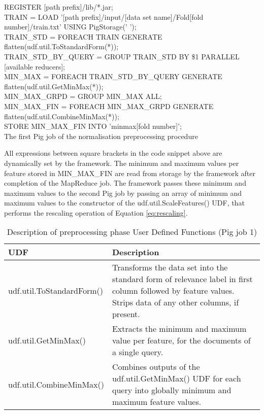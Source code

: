 \begin{algorithm}
REGISTER [path prefix]/lib/*.jar;\\
TRAIN = LOAD '[path prefix]/input/[data set name]/Fold[fold number]/train.txt' USING PigStorage(' ');\\
TRAIN\_STD = FOREACH TRAIN GENERATE flatten(udf.util.ToStandardForm(*));\\
TRAIN\_STD\_BY\_QUERY = GROUP TRAIN\_STD BY \$1 PARALLEL [available reducers];\\
MIN\_MAX = FOREACH TRAIN\_STD\_BY\_QUERY GENERATE flatten(udf.util.GetMinMax(*));\\
MIN\_MAX\_GRPD = GROUP MIN\_MAX ALL;\\
MIN\_MAX\_FIN = FOREACH MIN\_MAX\_GRPD GENERATE flatten(udf.util.CombineMinMax(*));\\
STORE MIN\_MAX\_FIN INTO 'minmax[fold number]';\\
\caption{The first Pig job of the normalisation preprocessing procedure}
\label{alg:pig_normalisation_1}
\end{algorithm}

All expressions between square brackets in the code snippet above are dynamically set by the framework. The minimum and maximum values per feature stored in MIN\_MAX\_FIN are read from storage by the framework after completion of the MapReduce job. The framework passes these minimum and maximum values to the second Pig job by passing an array of minimum and maximum values to the constructor of the udf.util.ScaleFeatures() \ac{UDF}, that performs the rescaling operation of Equation \ref{eq:rescaling}.\\

\begin{table}
\centering
\begin{tabular}{p{6cm}p{7cm}}\toprule
UDF & Description \\
\midrule
udf.util.ToStandardForm() & Transforms the data set into the standard form of relevance label in first column followed by feature values. Strips data of any other columns, if present.\\
udf.util.GetMinMax() & Extracts the minimum and maximum value per feature, for the documents of a single query.\\
udf.util.CombineMinMax() & Combines outputs of the udf.util.GetMinMax() UDF for each query into globally minimum and maximum feature values.\\
\bottomrule
\end{tabular}
\caption{Description of preprocessing phase User Defined Functions (Pig job 1)}
\label{tbl:preprocessing_udfs_1}
\end{table}

